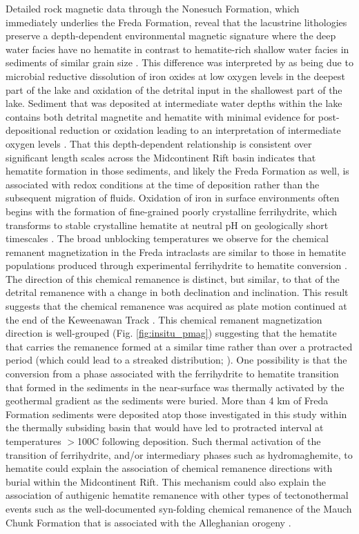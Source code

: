 \documentclass[draft]{agujournal2019}
\begin{document}
Detailed rock magnetic data through the Nonesuch Formation, which immediately underlies the Freda Formation, reveal that the lacustrine lithologies preserve a depth-dependent environmental magnetic signature where the deep water facies have no hematite in contrast to hematite-rich shallow water facies in sediments of similar grain size \cite{Slotznick2018b}. This difference was interpreted by  as being due to microbial reductive dissolution of iron oxides at low oxygen levels in the deepest part of the lake and oxidation of the detrital input in the shallowest part of the lake. Sediment that was deposited at intermediate water depths within the lake contains both detrital magnetite and hematite with minimal evidence for post-depositional reduction or oxidation leading to an interpretation of intermediate oxygen levels \cite{Slotznick2018b}. That this depth-dependent relationship is consistent over significant length scales across the Midcontinent Rift basin indicates that hematite formation in those sediments, and likely the Freda Formation as well, is associated with redox conditions at the time of deposition rather than the subsequent migration of fluids. Oxidation of iron in surface environments often begins with the formation of fine-grained poorly crystalline ferrihydrite, which transforms to stable crystalline hematite at neutral pH on geologically short timescales \cite{Cudennec2006a, Jiang2018a}. The broad unblocking temperatures we observe for the chemical remanent magnetization in the Freda intraclasts are similar to those in hematite populations produced through experimental ferrihydrite to hematite conversion \cite{Jiang2015a}. The direction of this chemical remanence is distinct, but similar, to that of the detrital remanence with a change in both declination and inclination. This result suggests that the chemical remanence was acquired as plate motion continued at the end of the Keweenawan Track \cite{Swanson-Hysell2019a}. This chemical remanent magnetization direction is well-grouped (Fig. \ref{fig:insitu_pmag}) suggesting that the hematite that carries the remanence formed at a similar time rather than over a protracted period (which could lead to a streaked distribution; \cite{Beck2003b}). One possibility is that the conversion from a phase associated with the ferrihydrite to hematite transition that formed in the sediments in the near-surface was thermally activated by the geothermal gradient as the sediments were buried. More than 4 km of Freda Formation sediments were deposited atop those investigated in this study within the thermally subsiding basin that would have led to protracted interval at temperatures $>$100\textdegree C following deposition. Such thermal activation of the transition of ferrihydrite, and/or intermediary phases such as hydromaghemite, to hematite could explain the association of chemical remanence directions with burial within the Midcontinent Rift. This mechanism could also explain the association of authigenic hematite remanence with other types of tectonothermal events such as the well-documented syn-folding chemical remanence of the Mauch Chunk Formation that is associated with the Alleghanian orogeny \cite{Kent1985b, Opdyke2004a}.
\end{document}
